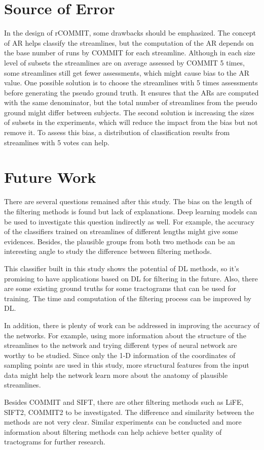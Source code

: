 \section{Source of Error}

In the design of rCOMMIT, some drawbacks should be emphasized. The concept of AR helps classify the streamlines, but the 
computation of the AR depends on the base number of runs by COMMIT for each streamline. 
Although in each size level of subsets the streamlines are on average assessed by COMMIT 5 times, some streamlines still get fewer assessments,
which might cause bias to the AR value. One possible solution is to choose the streamlines with 5 times assessments before
generating the pseudo ground truth. It ensures that the ARs are computed with the same denominator, 
but the total number of streamlines from the pseudo ground might differ between subjects.
The second solution is increasing the sizes of subsets in the experiments, which will reduce the impact from the bias but not remove it.
To assess this bias, a distribution of classification results from streamlines with 5 votes can help.




\section{Future Work}

There are several questions remained after this study. The bias on the length of the filtering methods
is found but lack of explanations. Deep learning models can be used to investigate this question indirectly as well.
For example, the accuracy of the classifiers trained on streamlines of different lengths might give some evidences.  
Besides, the plausible groups from both two methods can be an interesting angle to 
study the difference between filtering methods.  

This classifier built in this study shows the potential of DL methods, so it's promising to have applications 
based on DL for filtering in the future. Also, there are some existing ground truths for some tractograms that 
can be used for training. The time and computation of the filtering process can be improved by DL.   

In addition, there is plenty of work can be addressed in improving the accuracy of the networks.
For example, using more information about the structure of the streamlines to the network
and trying different types of neural network are worthy to be studied. Since only the 1-D information of the 
coordinates of sampling points are used in this study, more structural features from the input data might 
help the network learn more about the anatomy of plausible streamlines.

Besides COMMIT and SIFT, there are other filtering methods such as LiFE, SIFT2, COMMIT2 to be investigated.
The difference and similarity between the methods are not very clear. Similar experiments can be conducted and 
more information about filtering methods can help achieve better quality of tractograms for further research.






